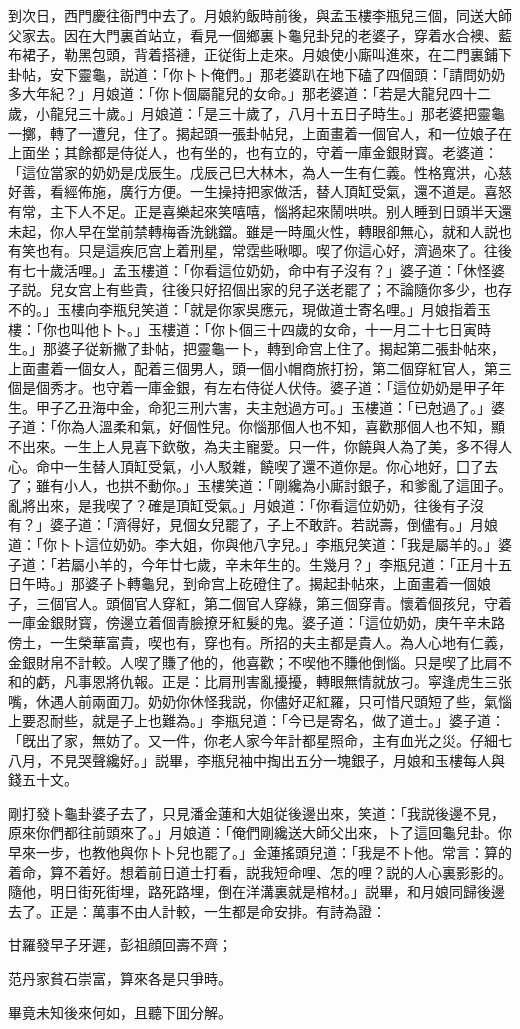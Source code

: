 到次日，西門慶往衙門中去了。月娘約飯時前後，與孟玉樓李瓶兒三個，同送大師父家去。因在大門裏首站立，看見一個鄉裏卜龜兒卦兒的老婆子，穿着水合襖、藍布裙子，勒黑包頭，背着搭褳，正従街上走來。月娘使小廝叫進來，在二門裏鋪下卦帖，安下靈龜，説道：「你卜卜俺們。」那老婆趴在地下磕了四個頭：「請問奶奶多大年紀？」月娘道：「你卜個屬龍兒的女命。」那老婆道：「若是大龍兒四十二歲，小龍兒三十歲。」月娘道：「是三十歲了，八月十五日子時生。」那老婆把靈龜一擲，轉了一遭兒，住了。揭起頭一張卦帖兒，上面畫着一個官人，和一位娘子在上面坐；其餘都是侍従人，也有坐的，也有立的，守着一庫金銀財寳。老婆道：「這位當家的奶奶是戊辰生。戊辰己巳大林木，為人一生有仁義。性格寬洪，心慈好善，看經佈施，廣行方便。一生操持把家做活，替人頂缸受氣，還不道是。喜怒有常，主下人不足。正是喜樂起來笑嘻嘻，惱將起來鬧哄哄。别人睡到日頭半天還未起，你人早在堂前禁轉梅香洗銚鐺。雖是一時風火性，轉眼卻無心，就和人説也有笑也有。只是這疾厄宫上着刑星，常霑些啾唧。喫了你這心好，濟過來了。往後有七十歲活哩。」孟玉樓道：「你看這位奶奶，命中有子沒有？」婆子道：「休怪婆子説。兒女宫上有些貴，往後只好招個出家的兒子送老罷了；不論隨你多少，也存不的。」玉樓向李瓶兒笑道：「就是你家吳應元，現做道士寄名哩。」月娘指着玉樓：「你也叫他卜卜。」玉樓道：「你卜個三十四歲的女命，十一月二十七日寅時生。」那婆子従新撇了卦帖，把靈龜一卜，轉到命宫上住了。揭起第二張卦帖來，上面畫着一個女人，配着三個男人，頭一個小帽商旅打扮，第二個穿紅官人，第三個是個秀才。也守着一庫金銀，有左右侍従人伏侍。婆子道：「這位奶奶是甲子年生。甲子乙丑海中金，命犯三刑六害，夫主尅過方可。」玉樓道：「已尅過了。」婆子道：「你為人溫柔和氣，好個性兒。你惱那個人也不知，喜歡那個人也不知，顯不出來。一生上人見喜下欽敬，為夫主寵愛。只一件，你饒與人為了美，多不得人心。命中一生替人頂缸受氣，小人駁雜，饒喫了還不道你是。你心地好，囗了去了；雖有小人，也拱不動你。」玉樓笑道：「剛纔為小廝討銀子，和爹亂了這囬子。亂將出來，是我喫了？確是頂缸受氣。」月娘道：「你看這位奶奶，往後有子沒有？」婆子道：「濟得好，見個女兒罷了，子上不敢許。若説壽，倒儘有。」月娘道：「你卜卜這位奶奶。李大姐，你與他八字兒。」李瓶兒笑道：「我是屬羊的。」婆子道：「若屬小羊的，今年廿七歲，辛未年生的。生幾月？」李瓶兒道：「正月十五日午時。」那婆子卜轉龜兒，到命宫上矻磴住了。揭起卦帖來，上面畫着一個娘子，三個官人。頭個官人穿紅，第二個官人穿綠，第三個穿青。懷着個孩兒，守着一庫金銀財寳，傍邊立着個青臉撩牙紅髮的鬼。婆子道：「這位奶奶，庚午辛未路傍土，一生榮華富貴，喫也有，穿也有。所招的夫主都是貴人。為人心地有仁義，金銀財帛不計較。人喫了賺了他的，他喜歡；不喫他不賺他倒惱。只是喫了比肩不和的虧，凡事恩將仇報。正是：比肩刑害亂擾擾，轉眼無情就放刁。寜逢虎生三张嘴，休遇人前兩面刀。奶奶你休怪我説，你儘好疋紅羅，只可惜尺頭短了些，氣惱上要忍耐些，就是子上也難為。」李瓶兒道：「今已是寄名，做了道士。」婆子道：「旣出了家，無妨了。又一件，你老人家今年計都星照命，主有血光之災。仔細七八月，不見哭聲纔好。」説畢，李瓶兒袖中掏出五分一塊銀子，月娘和玉樓每人與錢五十文。

剛打發卜龜卦婆子去了，只見潘金蓮和大姐従後邊出來，笑道：「我説後邊不見，原來你們都往前頭來了。」月娘道：「俺們剛纔送大師父出來，卜了這回龜兒卦。你早來一步，也教他與你卜卜兒也罷了。」金蓮搖頭兒道：「我是不卜他。常言：算的着命，算不着好。想着前日道士打看，説我短命哩、怎的哩？説的人心裏影影的。隨他，明日街死街埋，路死路埋，倒在洋溝裏就是棺材。」説畢，和月娘同歸後邊去了。正是：萬事不由人計較，一生都是命安排。有詩為證：

\begin{myquote}
甘羅發早子牙遲，彭祖顔回壽不齊；

范丹家貧石崇富，算來各是只爭時。
\end{myquote}

畢竟未知後來何如，且聽下囬分解。

